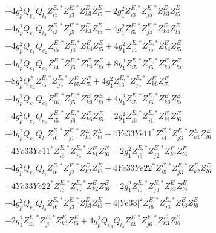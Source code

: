 \begin{align}
 &+4 g_{p}^{2} Q_{e_{2}} Q_{l_3} Z^{E,*}_{i 5} Z^{E,*}_{j 3} Z_{{k 3}}^{E} Z_{{l 5}}^{E} -2 g_{1}^{2} Z^{E,*}_{i 3} Z^{E,*}_{j 5} Z_{{k 3}}^{E} Z_{{l 5}}^{E} \nonumber \\ 
 &+4 g_{p}^{2} Q_{e_{2}} Q_{l_3} Z^{E,*}_{i 3} Z^{E,*}_{j 5} Z_{{k 3}}^{E} Z_{{l 5}}^{E} +4 g_{1}^{2} Z^{E,*}_{i 5} Z^{E,*}_{j 4} Z_{{k 4}}^{E} Z_{{l 5}}^{E} \nonumber \\ 
 &+4 g_{p}^{2} Q_{e_{1}} Q_{e_{2}} Z^{E,*}_{i 5} Z^{E,*}_{j 4} Z_{{k 4}}^{E} Z_{{l 5}}^{E} +4 g_{1}^{2} Z^{E,*}_{i 4} Z^{E,*}_{j 5} Z_{{k 4}}^{E} Z_{{l 5}}^{E} \nonumber \\ 
 &+4 g_{p}^{2} Q_{e_{1}} Q_{e_{2}} Z^{E,*}_{i 4} Z^{E,*}_{j 5} Z_{{k 4}}^{E} Z_{{l 5}}^{E} +8 g_{1}^{2} Z^{E,*}_{i 5} Z^{E,*}_{j 5} Z_{{k 5}}^{E} Z_{{l 5}}^{E} \nonumber \\ 
 &+8 g_{p}^{2} Q_{e_{2}}^{2} Z^{E,*}_{i 5} Z^{E,*}_{j 5} Z_{{k 5}}^{E} Z_{{l 5}}^{E} +4 g_{1}^{2} Z^{E,*}_{i 6} Z^{E,*}_{j 5} Z_{{k 6}}^{E} Z_{{l 5}}^{E} \nonumber \\ 
 &+4 g_{p}^{2} Q_{e_{2}} Q_{e_3} Z^{E,*}_{i 6} Z^{E,*}_{j 5} Z_{{k 6}}^{E} Z_{{l 5}}^{E} +4 g_{1}^{2} Z^{E,*}_{i 5} Z^{E,*}_{j 6} Z_{{k 6}}^{E} Z_{{l 5}}^{E} \nonumber \\ 
 &+4 g_{p}^{2} Q_{e_{2}} Q_{e_3} Z^{E,*}_{i 5} Z^{E,*}_{j 6} Z_{{k 6}}^{E} Z_{{l 5}}^{E} -2 g_{1}^{2} Z^{E,*}_{i 6} Z^{E,*}_{j 1} Z_{{k 1}}^{E} Z_{{l 6}}^{E} \nonumber \\ 
 &+4 g_{p}^{2} Q_{e_3} Q_{l_1} Z^{E,*}_{i 6} Z^{E,*}_{j 1} Z_{{k 1}}^{E} Z_{{l 6}}^{E} +4 Ye33 Ye11^* Z^{E,*}_{i 4} Z^{E,*}_{j 3} Z_{{k 1}}^{E} Z_{{l 6}}^{E} \nonumber \\ 
 &+4 Ye33 Ye11^* Z^{E,*}_{i 3} Z^{E,*}_{j 4} Z_{{k 1}}^{E} Z_{{l 6}}^{E} -2 g_{1}^{2} Z^{E,*}_{i 6} Z^{E,*}_{j 2} Z_{{k 2}}^{E} Z_{{l 6}}^{E} \nonumber \\ 
 &+4 g_{p}^{2} Q_{e_3} Q_{l_2} Z^{E,*}_{i 6} Z^{E,*}_{j 2} Z_{{k 2}}^{E} Z_{{l 6}}^{E} +4 Ye33 Ye22^* Z^{E,*}_{i 5} Z^{E,*}_{j 3} Z_{{k 2}}^{E} Z_{{l 6}}^{E} \nonumber \\ 
 &+4 Ye33 Ye22^* Z^{E,*}_{i 3} Z^{E,*}_{j 5} Z_{{k 2}}^{E} Z_{{l 6}}^{E} -2 g_{1}^{2} Z^{E,*}_{i 6} Z^{E,*}_{j 3} Z_{{k 3}}^{E} Z_{{l 6}}^{E} \nonumber \\ 
 &+4 g_{p}^{2} Q_{e_3} Q_{l_3} Z^{E,*}_{i 6} Z^{E,*}_{j 3} Z_{{k 3}}^{E} Z_{{l 6}}^{E} +4 |Ye33|^2 Z^{E,*}_{i 6} Z^{E,*}_{j 3} Z_{{k 3}}^{E} Z_{{l 6}}^{E} \nonumber \\ 
 &-2 g_{1}^{2} Z^{E,*}_{i 3} Z^{E,*}_{j 6} Z_{{k 3}}^{E} Z_{{l 6}}^{E} +4 g_{p}^{2} Q_{e_3} Q_{l_3} Z^{E,*}_{i 3} Z^{E,*}_{j 6} Z_{{k 3}}^{E} Z_{{l 6}}^{E} \nonumber \\ 

\end{align}
